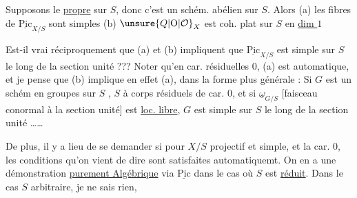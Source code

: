 Supposons le \uline{propre} sur $S$, donc c'est un schém. abélien
sur $S$. Alors (a) les fibres de $\underline{\mathrm{Pic}}_{X/S}$ sont simples
(b) \deleted{\unsure{$\Omega$}}$\unsure{Q|\mathrm O|\mathcal O}_X$ est coh. plat sur $S$ en  \uline{dim $1$}

\deleted{[ \unsure{Réuni|Réun.|Réc.}.} Est-il vrai réciproquement que (a) et (b)
impliquent que $\underline{\mathrm{Pic}}_{X/S}$ est simple sur $S$ le long de
la section unité ??? Noter qu'en car. résiduelles $0$,
(a) est automatique, et  je pense que (b)
implique en effet (a), dans la forme plus générale :
Si $G$ est un schém en groupes sur $S$ , $S$ à
corps résiduels de car. $0$, et si \deleted{\unsure{$\Omega$}} $\underline\omega_{G/S}$ [faisceau
conormal à la section unité] est \uline{loc. libre},  $G$ est
simple sur $S$ le long de la section unité \ldots\ldots

De plus, il y a lieu de se demander si pour $X/S$
projectif et simple, et la car. $0$, les conditions
qu'on vient de dire sont satisfaites automatiquemt. On
en a une démonstration \uline{purement Algébrique}
via $\underline{\mathrm{Pic}}$ dans le cas où $S$ est \uline{réduit}. Dans le
cas $S$ arbitraire, je ne sais rien, \uline{}
